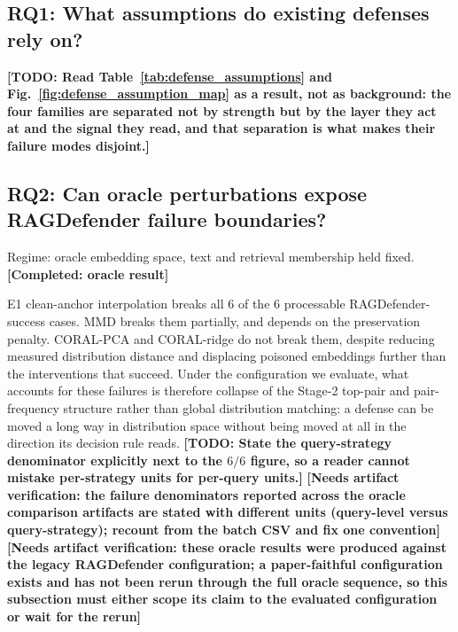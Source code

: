 \documentclass[conference]{IEEEtran}
\newcommand{\COMPLETED}[1]{\textbf{[Completed: #1]}}
\newcommand{\VERIFY}[1]{\textbf{[Needs artifact verification: #1]}}
\newcommand{\TODO}[1]{\textbf{[TODO: #1]}}
\newcommand{\NdevQ}{6}           %
\begin{document}
\subsection{RQ1: What assumptions do existing defenses rely on?}
\label{subsec:rq1}
\TODO{Read Table~\ref{tab:defense_assumptions} and
Fig.~\ref{fig:defense_assumption_map} as a result, not as background: the four
families are separated not by strength but by the layer they act at and the
signal they read, and that separation is what makes their failure modes
disjoint.}

\subsection{RQ2: Can oracle perturbations expose RAGDefender failure boundaries?}
\label{subsec:rq2}
Regime: oracle embedding space, text and retrieval membership held fixed.
\COMPLETED{oracle result}

E1 clean-anchor interpolation breaks all $\NdevQ$ of the $\NdevQ$ processable
RAGDefender-success cases. MMD breaks them partially, and depends on the
preservation penalty. CORAL-PCA and CORAL-ridge do not break them, despite
reducing measured distribution distance and displacing poisoned embeddings
further than the interventions that succeed. Under the configuration we evaluate,
what accounts for these failures is therefore collapse of the Stage-2 top-pair
and pair-frequency structure rather than global distribution matching: a defense
can be moved a long way in distribution space without being moved at all in the
direction its decision rule reads.
\TODO{State the query-strategy denominator explicitly next to the $\NdevQ/\NdevQ$
figure, so a reader cannot mistake per-strategy units for per-query units.}
\VERIFY{the failure denominators reported across the oracle comparison artifacts
are stated with different units (query-level versus query-strategy); recount from
the batch CSV and fix one convention}
\VERIFY{these oracle results were produced against the legacy RAGDefender
configuration; a paper-faithful configuration exists and has not been rerun
through the full oracle sequence, so this subsection must either scope its claim
to the evaluated configuration or wait for the rerun}
\end{document}
